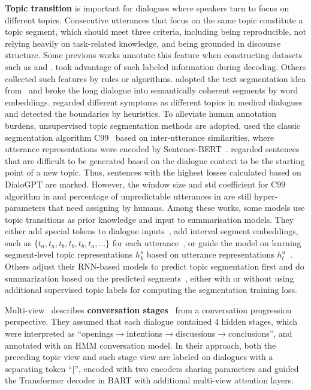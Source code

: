 \textbf{Topic transition} is important for dialogues where speakers turn to focus on different topics. Consecutive utterances that focus on the same topic constitute a topic segment, which should meet three criteria\cite{arguello2006topic}, including being reproducible, not relying heavily on task-related knowledge,  and being grounded in discourse structure.
Some previous works annotate this feature when constructing datasets such as \citet{carletta2005ami} and \citet{janin2003icsi}. 
\citet{di2020da} took advantage of such labeled information during decoding.
Others collected such features by rules or algorithms.
\citet{asi2022end} adopted the text segmentation idea from~\citet{alemi2015text} and broke the long dialogue into semantically coherent segments by word embeddings.
\citet{liu2019topic} regarded different symptoms as different topics in medical dialogues and detected the boundaries by heuristics.
To alleviate human annotation burdens, unsupervised topic segmentation methods are adopted. \citet{chen2020multi} used the classic segmentation algorithm C99~\cite{choi2000advances} based on inter-utterance similarities, where utterance representations were encoded by Sentence-BERT~\cite{reimers2019sentence}. \citet{feng2021language} regarded sentences that are difficult to be generated based on the dialogue context to be the starting point of a new topic. Thus, sentences with the highest losses calculated based on DialoGPT are marked.
However, the window size and std coefficient for C99 algorithm in %
\citet{chen2020multi} and percentage of unpredictable utterances in \citet{feng2021language} are still hyper-parameters that need assigning by humans.
Among these works, some models use topic transitions as prior knowledge and input to summarisation models. They either add special tokens to dialogue inputs~\cite{chen2020multi,feng2021language}, add interval segment embeddings, such as $\{t_a, t_a, t_b, t_b, t_b, t_a,...\}$ for each utterance~\cite{qi2021improving}, or guide the model on learning segment-level topic representations $h_k^s$ based on utterance representations $h_t^u$~\cite{zheng2020abstractive}.
Others adjust their RNN-based models to predict topic segmentation first and do summarization based on the predicted segments~\cite{liu2019topic,li2019keep}, either with or without using additional supervised topic labels for computing the segmentation training loss. 

Multi-view~\cite{chen2020multi} describes \textbf{conversation stages}~\cite{althoff2016large} from a conversation progression perspective. They assumed that each dialogue contained $4$ hidden stages, which were interpreted as ``openings$\rightarrow$intentions$\rightarrow$discussions$\rightarrow$conclusions'', and annotated with an HMM conversation model. In their approach, both the preceding topic view and such stage view are labeled on dialogues with a separating token ``|'', encoded with two encoders sharing parameters and guided the Transformer decoder in BART with additional multi-view attention layers. 

